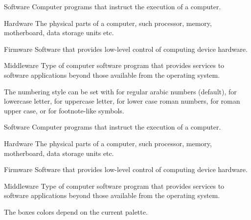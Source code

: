 \documentclass[a4paper, 11pt]{article}
\begin{document}
\begin{example}{}
    \begin{PLTBoxRaster}[enumerate]
        \item[Software] Computer programs that instruct the execution of a computer.
        \item[Hardware] The physical parts of a computer, such processor, memory, motherboard, data storage units etc.
        \item[Firmware] Software that provides low-level control of computing device hardware.
        \item[Middleware] Type of computer software program that provides services to software applications beyond those available from the operating system.
    \end{PLTBoxRaster}
\end{example}

The numbering style can be set with  for regular arabic numbers (default),  for lowercase letter,  for uppercase letter,  for lower case roman numbers,  for roman upper case, or  for footnote-like symbols.

\begin{example}{}
    \begin{PLTBoxRaster}
        \item[Software] Computer programs that instruct the execution of a computer.
        \item[Hardware] The physical parts of a computer, such processor, memory, motherboard, data storage units etc.
        \item[Firmware] Software that provides low-level control of computing device hardware.
        \item[Middleware] Type of computer software program that provides services to software applications beyond those available from the operating system.
    \end{PLTBoxRaster}
\end{example}

The boxes colors depend on the current palette.
\end{document}
